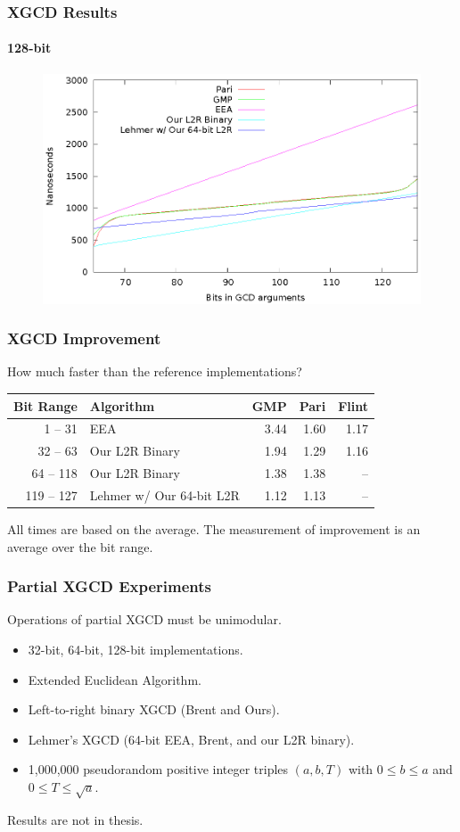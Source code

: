 \documentclass{beamer}
\newcommand{\smallfont}{\fontsize{6pt}{7.2}\selectfont}
\begin{document}
\begin{frame}
\frametitle{XGCD Results}
\framesubtitle{128-bit}
\begin{figure}
\includegraphics[scale=0.86]{xgcd-best-128}
\end{figure}
\end{frame}

\begin{frame}
\frametitle{XGCD Improvement}

How much faster than the reference implementations?
\begin{table}
\centering
\begin{tabular}{ | r | l | r | r | r | }
\hline
Bit Range & Algorithm & GMP & Pari & Flint \\
\hline
1 -- 31 & EEA & 3.44 & 1.60 & 1.17 \\
32 -- 63 & Our L2R Binary & 1.94 & 1.29 & 1.16 \\
64 -- 118 & Our L2R Binary & 1.38 & 1.38 & -- \\
119 -- 127 & Lehmer w/ Our 64-bit L2R & 1.12 & 1.13 & -- \\
\hline
\end{tabular}
\end{table}

\bigskip
\smallfont
All times are based on the average.  The measurement of improvement is an average over the bit range.
\end{frame}


\begin{frame}
\frametitle{Partial XGCD Experiments}
Operations of partial XGCD must be unimodular.
\begin{itemize}
\item 32-bit, 64-bit, 128-bit implementations.
\item Extended Euclidean Algorithm.
\item Left-to-right binary XGCD (Brent and Ours).
\item Lehmer's XGCD (64-bit EEA, Brent, and our L2R binary).
\item 1,000,000 pseudorandom positive integer triples $(a, b, T)$ with $0 \le b \le a$ and $0 \le T \le \sqrt a$.
\end{itemize}

\bigskip
\smallfont
Results are not in thesis.
\end{frame}
\end{document}
